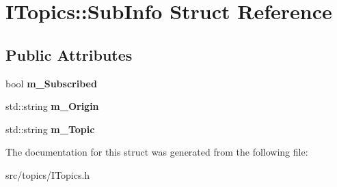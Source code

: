 \hypertarget{struct_i_topics_1_1_sub_info}{}\section{I\+Topics\+:\+:Sub\+Info Struct Reference}
\label{struct_i_topics_1_1_sub_info}
\subsection*{Public Attributes}
\begin{DoxyCompactItemize}
\item 
\mbox{\label{struct_i_topics_1_1_sub_info_a2f67f2d0803f0d9351a296354de3d67d}} 
bool {\bfseries m\+\_\+\+Subscribed}
\item 
\mbox{\label{struct_i_topics_1_1_sub_info_ab4cee32b84ebfef1652681dbfb04e9b3}} 
std\+::string {\bfseries m\+\_\+\+Origin}
\item 
\mbox{\label{struct_i_topics_1_1_sub_info_aeadcf0c8e0c9f18b7115d6570e5266c3}} 
std\+::string {\bfseries m\+\_\+\+Topic}
\end{DoxyCompactItemize}


The documentation for this struct was generated from the following file\+:\begin{DoxyCompactItemize}
\item 
src/topics/I\+Topics.\+h\end{DoxyCompactItemize}
